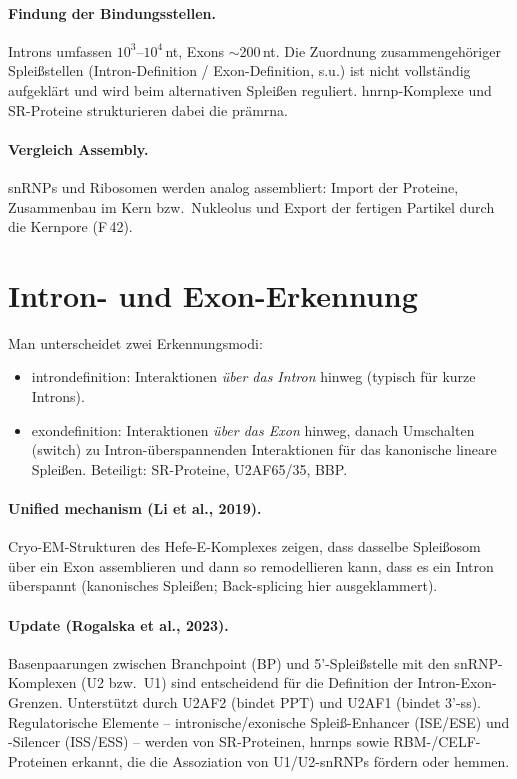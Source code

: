 \paragraph{Findung der Bindungsstellen.} Introns umfassen
$10^3$--$10^4$\,nt, Exons $\sim$200\,nt.
Die Zuordnung zusammengehöriger
Spleißstellen (Intron-Definition / Exon-Definition, s.u.) ist nicht vollständig
aufgeklärt und wird beim alternativen Spleißen reguliert.
\gls{hnrnp}-Komplexe und
SR-Proteine strukturieren dabei die \gls{prämrna}.


\paragraph{Vergleich Assembly.} snRNPs und Ribosomen werden analog assembliert:
Import der Proteine, Zusammenbau im Kern bzw.\ Nukleolus und Export der fertigen
Partikel durch die Kernpore (F\,42).


\section{Intron- und Exon-Erkennung}\label{sec:intron--und-exon-erkennung}

Man unterscheidet zwei Erkennungsmodi:
\begin{itemize}
    \item \gls{introndefinition}: Interaktionen \emph{über das Intron} hinweg
    (typisch für kurze Introns).
    \item \gls{exondefinition}: Interaktionen \emph{über das Exon} hinweg,
    danach Umschalten (switch) zu Intron-überspannenden Interaktionen
    für das kanonische lineare Spleißen.
    Beteiligt: SR-Proteine, U2AF65/35, BBP\@.
\end{itemize}

\paragraph{Unified mechanism (Li et al., 2019).} Cryo-EM-Strukturen des
Hefe-E-Komplexes zeigen, dass dasselbe Spleißosom über ein Exon assemblieren
und dann so remodellieren kann, dass es ein Intron überspannt (kanonisches
Spleißen; Back-splicing hier ausgeklammert).

\paragraph{Update (Rogalska et al., 2023).} Basenpaarungen zwischen Branchpoint
(BP) und 5'-Spleißstelle mit den snRNP-Komplexen (U2 bzw.\ U1)
sind entscheidend für die Definition der Intron-Exon-Grenzen.
Unterstützt durch
U2AF2 (bindet PPT) und U2AF1 (bindet 3'-ss).
Regulatorische
Elemente -- intronische/exonische Spleiß-Enhancer (ISE/ESE) und -Silencer
(ISS/ESS) -- werden von SR-Proteinen, \gls{hnrnp}s sowie RBM-/CELF-Proteinen
erkannt, die die Assoziation von U1/U2-snRNPs fördern oder hemmen.

